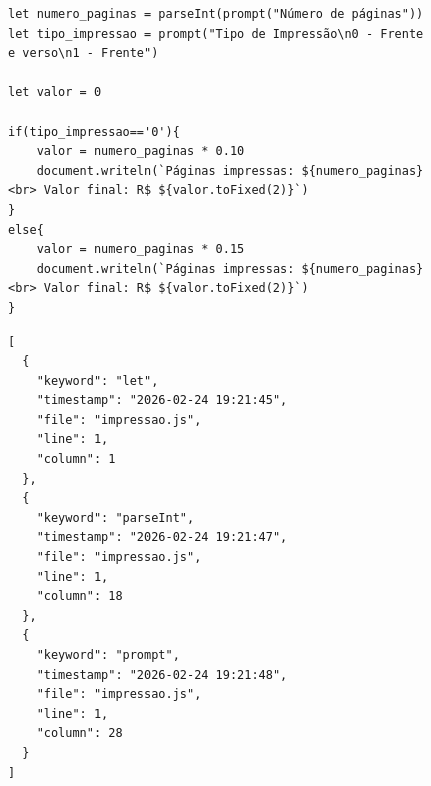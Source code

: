 \begin{figure}[H]
    \centering
    \begin{minipage}{0.48\textwidth}
        \centering
        \begin{lstlisting}[style=jsonstyle, caption={Algoritmo de cálculo de impressão - exemplo didático}, label={lst:algoritmo-impressao-js}]
let numero_paginas = parseInt(prompt("Número de páginas"))
let tipo_impressao = prompt("Tipo de Impressão\n0 - Frente e verso\n1 - Frente")

let valor = 0

if(tipo_impressao=='0'){
    valor = numero_paginas * 0.10
    document.writeln(`Páginas impressas: ${numero_paginas}<br> Valor final: R$ ${valor.toFixed(2)}`)
}
else{
    valor = numero_paginas * 0.15
    document.writeln(`Páginas impressas: ${numero_paginas}<br> Valor final: R$ ${valor.toFixed(2)}`)
}
        \end{lstlisting}
    \end{minipage}
    \hfill
    \begin{minipage}{0.48\textwidth}
        \centering
        \begin{lstlisting}[style=jsonstyle, caption={Exemplo de saída da extensão LOGADO}, label={lst:algoritmo-impressao-json}]
[
  {
    "keyword": "let",
    "timestamp": "2026-02-24 19:21:45",
    "file": "impressao.js",
    "line": 1,
    "column": 1
  },
  {
    "keyword": "parseInt",
    "timestamp": "2026-02-24 19:21:47",
    "file": "impressao.js",
    "line": 1,
    "column": 18
  },
  {
    "keyword": "prompt",
    "timestamp": "2026-02-24 19:21:48",
    "file": "impressao.js",
    "line": 1,
    "column": 28
  }
]
        \end{lstlisting}
    \end{minipage}
\end{figure}

